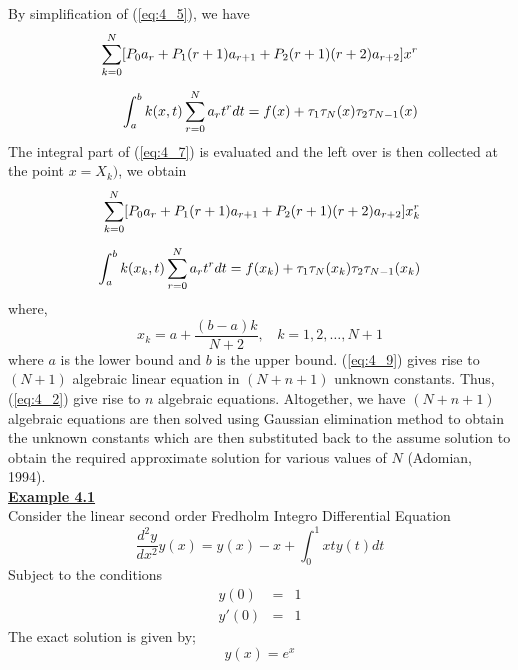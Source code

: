 \documentclass[12pt]{report}
\newcommand{\ubt}[1]{\textbf{\underline{#1}}}
\newcommand{\sps}{\\[0.2cm]}
\newcommand{\refn}[1]{(\ref{#1})}
\newcommand{\refx}[1]{\refn{eq:#1}}
\newcommand{\IDE}{Integro Differential Equation}
\newcommand{\sprime}{'}
\newcommand{\NI}{\noindent}
\begin{document}
	By simplification of \refx{4_5}, we have
	\begin{eqnarray}
		\sum_{k=0}^{N}[P_0a_r + P_1(r+1)a_{r+1} + P_2(r+1)(r+2)a_{r+2}]x^r \notag \sps
		\int_{a}^{b}k(x,t)\sum_{r=0}^{N}a_rt^r dt = f(x) + \tau_1\tau_N(x) \tau_2\tau_{N-1}(x) \label{eq:4_7}
	\end{eqnarray}
	The integral part of \refx{4_7} is evaluated and the left over is then collected at the point $x=X_k)$, we obtain
	\begin{eqnarray}
		\sum_{k=0}^{N}[P_0a_r + P_1(r+1)a_{r+1} + P_2(r+1)(r+2)a_{r+2}]x_k^r \notag \sps
		\int_{a}^{b}k(x_k,t)\sum_{r=0}^{N}a_rt^r dt = f(x_k) + \tau_1\tau_N(x_k) \tau_2\tau_{N-1}(x_k) \label{eq:4_8}
	\end{eqnarray}
	where,
	\begin{equation}
		x_k = a + \frac{(b-a)k}{N+2}, ~~~~ k=1,2,\ldots,N+1 \label{eq:4_9}
	\end{equation}
	where $a$ is the lower bound and $b$ is the upper bound. \refx{4_9} gives rise to $(N+1)$ algebraic linear equation in $(N+n+1)$ unknown constants. Thus, \refx{4_2} give rise to $n$ algebraic equations. Altogether, we have $(N+n+1)$ algebraic equations are then solved using Gaussian elimination method to obtain the unknown constants which are then substituted back to the assume solution to obtain the required approximate solution for various values of $N$ (Adomian, 1994).\\
	
	\NI\ubt{Example 4.1}\sps
	Consider the linear second order Fredholm \IDE~
	\begin{equation}
		\frac{d^2y}{dx^2}y(x) = y(x) - x + \int_0^1xty(t)dt \label{eq:4_10}
	\end{equation}
	Subject to the conditions
	\begin{eqnarray}
		y(0)&=&1 \label{eq:4_11} \sps
		y\sprime(0)&=&1 \label{eq:4_12}
	\end{eqnarray}
	The exact solution is given by;
	\begin{equation}
		y(x) = e^x \label{eq:4_13}
	\end{equation}
	
\end{document}
